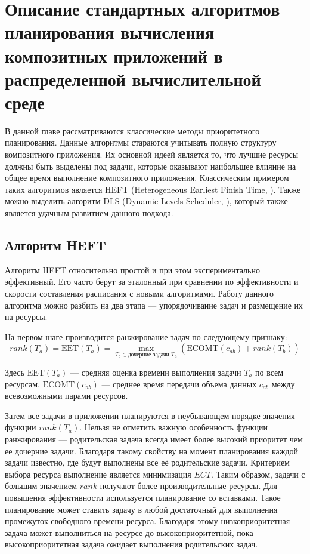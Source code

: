 \chapter*{Описание стандартных алгоритмов планирования вычисления композитных приложений в распределенной вычислительной среде}
\begin{spacing}{1.5}

В данной главе рассматриваются классические методы приоритетного планирования. Данные алгоритмы стараются учитывать полную структуру композитного приложения. Их основной идеей является то, что лучшие ресурсы должны быть выделены под задачи, которые оказывают наибольшее влияние на общее время выполнение композитного приложения.  Классическим примером таких алгоритмов является HEFT (Heterogeneous Earliest Finish Time, \cite{HEFT}). Также можно выделить алгоритм DLS (Dynamic Levels Scheduler, \cite{DLS}), который также является удачным развитием данного подхода.



\section*{Алгоритм HEFT}

Алгоритм HEFT относительно простой и при этом экспериментально эффективный. Его часто берут за эталонный при сравнении по эффективности и скорости составления расписания с новыми алгоритмами. Работу данного алгоритма можно разбить на два этапа --- упорядочивание задач и размещение их на ресурсы.


На первом шаге производится ранжирование задач по следующему признаку:
$$
rank(T_a) = \overline{\mbox{EET}}(T_a) = \max_{T_b \in \text{дочерние задачи $T_a$}}(\overline{\mbox{ECOMT}} (c_{ab}) + rank (T_b))
$$

Здесь $\overline{\mbox{EET}}(T_a)$ --- средняя оценка времени выполнения задачи $T_a$ по всем ресурсам, $\overline{\mbox{ECOMT}}(c_{ab})$ --- среднее время передачи объема данных $c_{ab}$ между всевозможными парами ресурсов.

Затем все задачи в приложении планируются в неубывающем порядке значения функции $rank(T_a)$. Нельзя не отметить важную особенность функции ранжирования --- родительская задача всегда имеет более высокий приоритет чем ее дочерние задачи. Благодаря такому свойству на момент планирования каждой задачи известно, где будут выполнены все её родительские задачи. Критерием выбора ресурса выполнение является минимизация $ECT$. Таким образом, задачи с большим значением $rank$ получают более производительные ресурсы. Для повышения эффективности используется планирование со вставками. Такое планирование может ставить задачу в любой достаточный для выполнения промежуток свободного времени ресурса. Благодаря этому низкоприоритетная задача может выполниться на ресурсе до высокоприоритетной, пока высокоприоритетная задача ожидает выполнения родительских задач.


\end{spacing}
